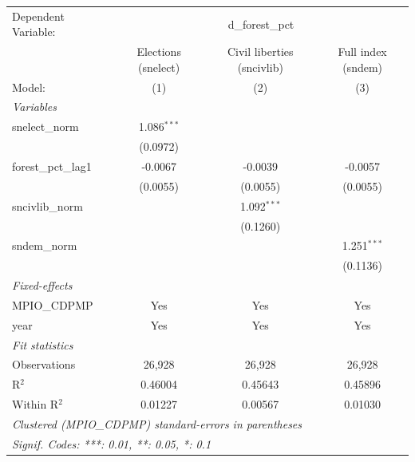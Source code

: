 
\begingroup
\centering
\begin{tabular}{lccc}
   \tabularnewline \midrule \midrule
   Dependent Variable: & \multicolumn{3}{c}{d\_forest\_pct}\\
                       & Elections (snelect) & Civil liberties (sncivlib) & Full index (sndem) \\   
   Model:              & (1)                 & (2)                        & (3)\\  
   \midrule
   \emph{Variables}\\
   snelect\_norm       & 1.086$^{***}$       &                            &   \\   
                       & (0.0972)            &                            &   \\   
   forest\_pct\_lag1   & -0.0067             & -0.0039                    & -0.0057\\   
                       & (0.0055)            & (0.0055)                   & (0.0055)\\   
   sncivlib\_norm      &                     & 1.092$^{***}$              &   \\   
                       &                     & (0.1260)                   &   \\   
   sndem\_norm         &                     &                            & 1.251$^{***}$\\   
                       &                     &                            & (0.1136)\\   
   \midrule
   \emph{Fixed-effects}\\
   MPIO\_CDPMP         & Yes                 & Yes                        & Yes\\  
   year                & Yes                 & Yes                        & Yes\\  
   \midrule
   \emph{Fit statistics}\\
   Observations        & 26,928              & 26,928                     & 26,928\\  
   R$^2$               & 0.46004             & 0.45643                    & 0.45896\\  
   Within R$^2$        & 0.01227             & 0.00567                    & 0.01030\\  
   \midrule \midrule
   \multicolumn{4}{l}{\emph{Clustered (MPIO\_CDPMP) standard-errors in parentheses}}\\
   \multicolumn{4}{l}{\emph{Signif. Codes: ***: 0.01, **: 0.05, *: 0.1}}\\
\end{tabular}
\par\endgroup


